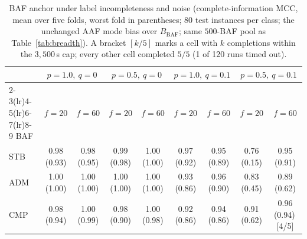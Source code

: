 \begin{table}[t]
\centering
\footnotesize
\setlength{\tabcolsep}{4pt}
\caption{BAF anchor under label incompleteness and noise (complete-information
MCC, mean over five folds, worst fold in parentheses; $80$ test instances per
class; the unchanged AAF mode bias over $B_{\mathrm{BAF}}$; same $500$-BAF pool
as Table~\ref{tab:breadth}). A bracket $[k/5]$ marks a cell with $k$ completions
within the $3{,}500$\,s cap; every other cell completed $5/5$ (1 of 120 runs
timed out).}
\label{tab:bafanchor}
\begin{tabular}{lcccccccc}
\toprule
& \multicolumn{2}{c}{$p{=}1.0,\ q{=}0$} & \multicolumn{2}{c}{$p{=}0.5,\ q{=}0$}
& \multicolumn{2}{c}{$p{=}1.0,\ q{=}0.1$} & \multicolumn{2}{c}{$p{=}0.5,\ q{=}0.1$}\\
\cmidrule(lr){2-3}\cmidrule(lr){4-5}\cmidrule(lr){6-7}\cmidrule(lr){8-9}
BAF & $f{=}20$ & $f{=}60$ & $f{=}20$ & $f{=}60$ & $f{=}20$ & $f{=}60$ & $f{=}20$ & $f{=}60$\\
\midrule
STB & 0.98 (0.93) & 0.98 (0.95) & 0.99 (0.98) & 1.00 (1.00) & 0.97 (0.92) & 0.95 (0.89) & 0.76 (0.15) & 0.95 (0.91)\\
ADM & 1.00 (1.00) & 1.00 (1.00) & 1.00 (1.00) & 1.00 (1.00) & 0.93 (0.86) & 0.96 (0.90) & 0.83 (0.45) & 0.89 (0.62)\\
CMP & 0.98 (0.94) & 1.00 (0.99) & 0.98 (0.90) & 1.00 (0.98) & 0.92 (0.86) & 0.94 (0.86) & 0.91 (0.62) & 0.96 (0.94)\,[4/5]\\
\bottomrule\end{tabular}\end{table}
